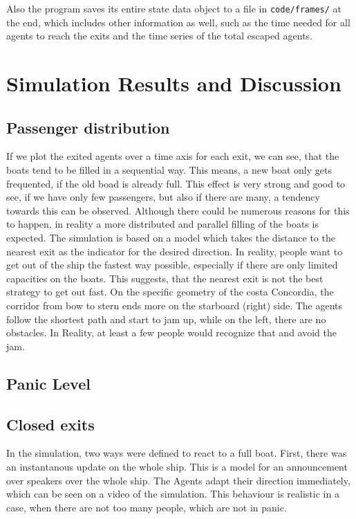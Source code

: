 \documentclass[11pt]{article}
\begin{document}
Also the program saves its entire state data object to a file in
\texttt{code/frames/} at the end, which includes other information as well,
such as the time needed for all agents to reach the exits and the time series
of the total escaped agents.

\section{Simulation Results and Discussion}

\subsection{Passenger distribution} %
If we plot the exited agents over a time axis for each exit, we can see, that the boats tend to be filled in a sequential way.
This means, a new boat only gets frequented, if the old boad is already full. This effect is very strong and good to see, if we have only few passengers, but also if there are many, a tendency towards this can be observed.
Although there could be numerous reasons for this to happen, in reality a more distributed and parallel filling of the boats is expected. The simulation is based on a model which takes the distance to the nearest exit as the indicator for the desired direction.
In reality, people want to get out of the ship the fastest way possible, especially if there are only limited capacities on the boats.
This suggests, that the nearest exit is not the best strategy to get out fast.
On the specific geometry of the costa Concordia, the corridor from bow to stern ends more on the starboard (right) side. 
The agents follow the shortest path and start to jam up, while on the left, there are no obstacles.
In Reality, at least a few people would recognize that and avoid the jam.

\subsection{Panic Level} %

\subsection{Closed exits} %
\label{sub:Closed exits}
In the simulation, two ways were defined to react to a full boat. First, there was an instantanous update on the whole ship.
This is a model for an announcement over speakers over the whole ship.
The Agents adapt their direction immediately, which can be seen on a video of the simulation.
This behaviour is realistic in a case, when there are not too many people, which are not in panic.
\end{document}
